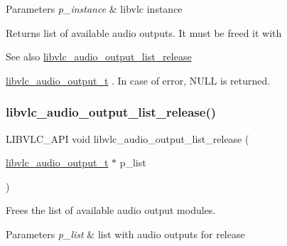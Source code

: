 \begin{DoxyParams}{Parameters}
{\em p\+\_\+instance} & libvlc instance \\
\hline
\end{DoxyParams}
\begin{DoxyReturn}{Returns}
list of available audio outputs. It must be freed it with 
\end{DoxyReturn}
\begin{DoxySeeAlso}{See also}
\hyperlink{group__libvlc__audio_ga9f573074e83bd671b90468b459dc9577}{libvlc\+\_\+audio\+\_\+output\+\_\+list\+\_\+release} 

\hyperlink{structlibvlc__audio__output__t}{libvlc\+\_\+audio\+\_\+output\+\_\+t} . In case of error, N\+U\+LL is returned. 
\end{DoxySeeAlso}
\mbox{\label{group__libvlc__audio_ga9f573074e83bd671b90468b459dc9577}} 
\subsubsection{\texorpdfstring{libvlc\+\_\+audio\+\_\+output\+\_\+list\+\_\+release()}{libvlc\_audio\_output\_list\_release()}}
{\footnotesize\ttfamily L\+I\+B\+V\+L\+C\+\_\+\+A\+PI void libvlc\+\_\+audio\+\_\+output\+\_\+list\+\_\+release (\begin{DoxyParamCaption}\item[{\hyperlink{structlibvlc__audio__output__t}{libvlc\+\_\+audio\+\_\+output\+\_\+t} $\ast$}]{p\+\_\+list }\end{DoxyParamCaption})}

Frees the list of available audio output modules.


\begin{DoxyParams}{Parameters}
{\em p\+\_\+list} & list with audio outputs for release \\
\hline
\end{DoxyParams}
\mbox{\label{group__libvlc__audio_ga1e0e783b4b68a4544cc688d8f8c38284}} 
